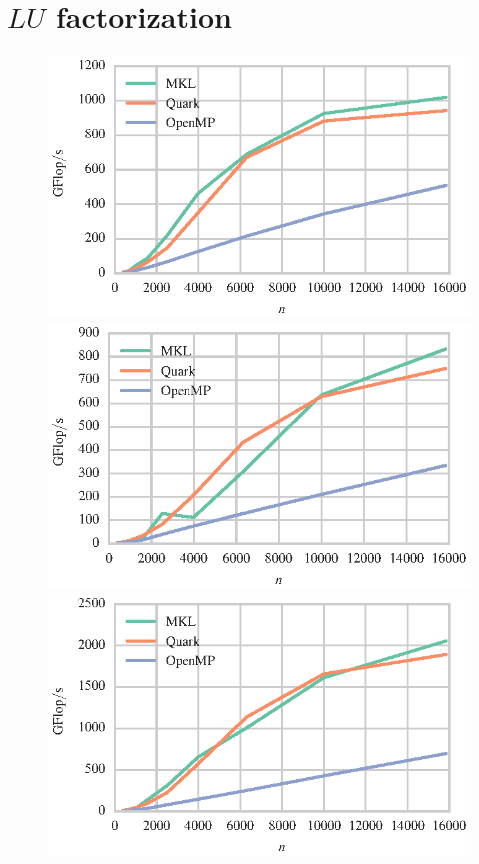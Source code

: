 \documentclass[a4paper,12pt]{article}
\begin{document}
\section{$LU$ factorization}
\label{sec.lu}
\begin{figure}[t]
  \centering
  \includegraphics[scale=.85]{fig/kebnekaise_zgetrf_weak_scaling.eps}
  \includegraphics[scale=.85]{fig/kebnekaise_dgetrf_weak_scaling.eps}
  \includegraphics[scale=.85]{fig/kebnekaise_cgetrf_weak_scaling.eps}

\end{figure}
\end{document}

